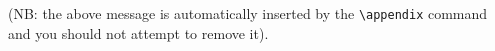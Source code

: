 \begin{it}
(NB:  the above message is automatically inserted by the \verb|\appendix| command and you should not attempt to remove it).
\end{it}







